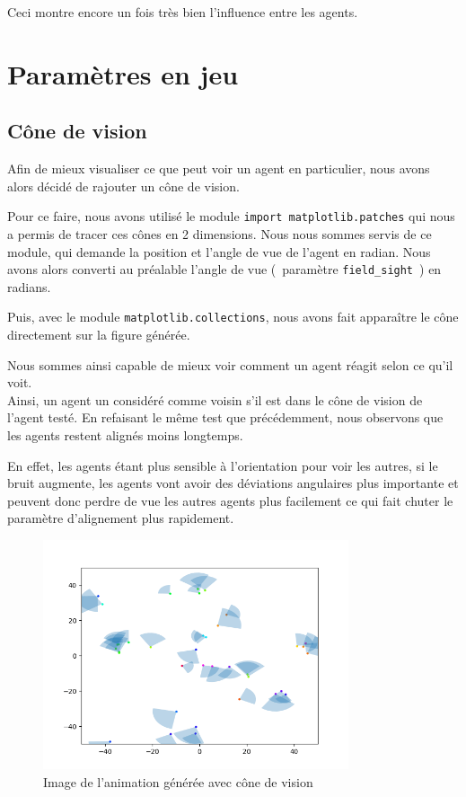 \documentclass[french, a4paper, 12pt, openany]{report}
\begin{document}
	Ceci montre encore un fois très bien l'influence entre les agents.
\newpage
\section{Paramètres en jeu}
	\subsection{Cône de vision}
	
		Afin de mieux visualiser ce que peut voir un agent en particulier, nous avons alors décidé de rajouter un cône de vision.
     
      Pour ce faire, nous avons utilisé le module \verb|import matplotlib.patches| qui nous a permis de tracer ces cônes en 2 dimensions. Nous nous sommes servis de ce module, qui demande la position et l'angle de vue de l'agent en radian. Nous avons alors converti au préalable l'angle de vue (~paramètre \verb|field_sight|~) en radians.
      
      Puis, avec le module \verb|matplotlib.collections|, nous avons fait apparaître le cône directement sur la figure générée.
		
		Nous sommes ainsi capable de mieux voir comment un agent réagit selon ce qu'il voit. \\
		
		Ainsi, un agent un considéré comme voisin s'il est dans le cône de vision de l'agent testé. En refaisant le même test que précédemment, nous observons que les agents restent alignés moins longtemps.
		
		En effet, les agents étant plus sensible à l'orientation pour voir les autres, si le bruit augmente, les agents vont avoir des déviations angulaires plus importante et peuvent donc perdre de vue les autres agents plus facilement ce qui fait chuter le paramètre d'alignement plus rapidement.
	
   \begin{figure}[!h]
		\centering
		\includegraphics[width=9cm]{images/image_12.png}
		\caption{Image de l'animation générée avec cône de vision}
		\label{cone_vision}
	\end{figure}  
	
\end{document}
